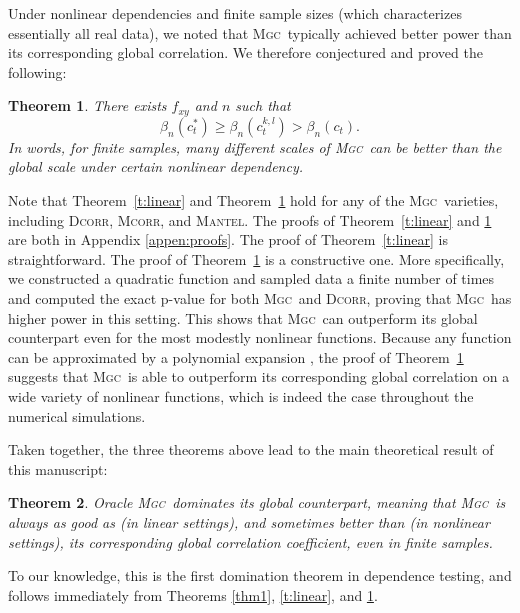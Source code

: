 \documentclass[11pt]{article}
\providecommand{\sct}[1]{{\normalfont\textsc{#1}}}
\newcommand{\G}{c}
\newcommand{\Mgc}{\sct{Mgc}}
\newcommand{\Dcorr}{\sct{Dcorr}}
\newcommand{\Mcorr}{\sct{Mcorr}}
\newcommand{\Mantel}{\sct{Mantel}}
\newtheorem{thm}{Theorem}
\begin{document}
Under nonlinear dependencies and finite sample sizes (which characterizes essentially all real data), we noted that \Mgc~typically achieved better power than its corresponding global correlation. 
We therefore conjectured and proved the following:
\begin{thm}
\label{t:non}
There exists $f_{xy}$ and $n$ such that
\begin{equation}
\beta_n(\G^{*}_{t}) \geq \beta_n(\G^{k,l}_{t}) > \beta_n(\G_{t}).
\end{equation}
In words, for finite samples, many different scales of \Mgc~can be better than the global scale under certain nonlinear dependency.
\end{thm}
Note that Theorem~\ref{t:linear} and Theorem~\ref{t:non} hold for any of the \Mgc~varieties, including  \Dcorr, \Mcorr, and \Mantel.
%
The proofs of Theorem~\ref{t:linear} and \ref{t:non} are both in Appendix \ref{appen:proofs}.  The proof of Theorem~\ref{t:linear} is straightforward.  The proof of Theorem~\ref{t:non} is a constructive one. More specifically, we constructed a quadratic function and sampled data a finite number of times and computed the exact p-value for both \Mgc~and \Dcorr, proving that \Mgc~has higher power in this setting. This shows that \Mgc~can outperform its global counterpart even for the most modestly nonlinear functions.  Because any function can be approximated by a polynomial expansion \cite{RudinBook}, the proof of Theorem~\ref{t:non} suggests that \Mgc~is able to outperform its corresponding global correlation on a wide variety of nonlinear functions, which is indeed the case throughout the numerical simulations. %

Taken together, the three theorems above lead to the main theoretical result of this manuscript:
\begin{thm} \label{t:dominate}
Oracle \Mgc~dominates its global counterpart, meaning that \Mgc~is always as good as (in linear settings), and sometimes better than (in nonlinear settings), its corresponding global correlation coefficient, even in finite samples. 
\end{thm}

To our knowledge, this is the first domination theorem in dependence testing, and follows immediately from Theorems \ref{thm1}, \ref{t:linear}, and \ref{t:non}.
\end{document}
